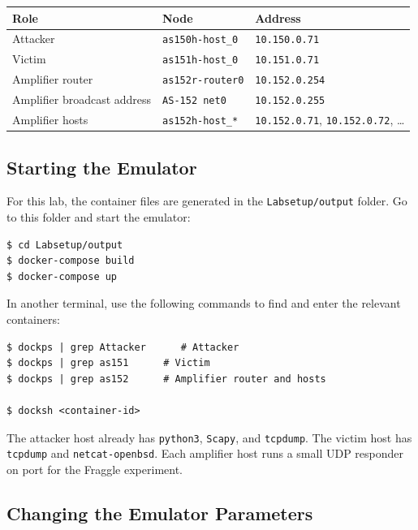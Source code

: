 \begin{center}
\begin{tabular}{|l|l|l|}
\hline
\textbf{Role} & \textbf{Node} & \textbf{Address} \\
\hline
Attacker & \texttt{as150h-host\_0} & \texttt{10.150.0.71} \\
Victim & \texttt{as151h-host\_0} & \texttt{10.151.0.71} \\
Amplifier router & \texttt{as152r-router0} & \texttt{10.152.0.254} \\
Amplifier broadcast address & \texttt{AS-152 net0} & \texttt{10.152.0.255} \\
Amplifier hosts & \texttt{as152h-host\_*} & \texttt{10.152.0.71}, \texttt{10.152.0.72}, \ldots \\
\hline
\end{tabular}
\end{center}


\subsection{Starting the Emulator}



For this lab, the container files are generated in the \texttt{Labsetup/output}
folder. Go to this folder and start the emulator:

\begin{lstlisting}
$ cd Labsetup/output
$ docker-compose build
$ docker-compose up
\end{lstlisting}

In another terminal, use the following commands to find and enter the relevant
containers:

\begin{lstlisting}
$ dockps | grep Attacker      # Attacker
$ dockps | grep as151      # Victim
$ dockps | grep as152      # Amplifier router and hosts

$ docksh <container-id>
\end{lstlisting}

The attacker host already has \texttt{python3}, \texttt{Scapy}, and
\texttt{tcpdump}. The victim host has \texttt{tcpdump} and
\texttt{netcat-openbsd}. Each amplifier host runs a small UDP responder on port
\fraggleport for the Fraggle experiment.


\subsection{Changing the Emulator Parameters}

